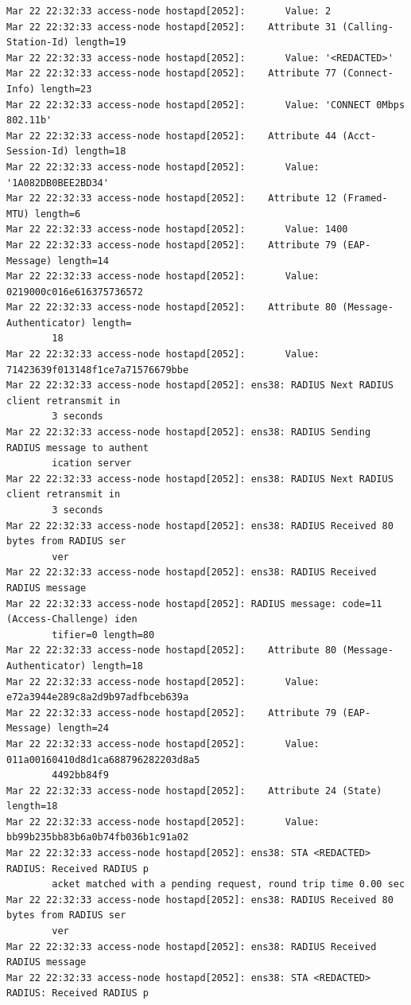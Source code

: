 \documentclass[11pt]{article}
\begin{document}
\begin{verbatim}
Mar 22 22:32:33 access-node hostapd[2052]:       Value: 2
Mar 22 22:32:33 access-node hostapd[2052]:    Attribute 31 (Calling-Station-Id) length=19
Mar 22 22:32:33 access-node hostapd[2052]:       Value: '<REDACTED>'
Mar 22 22:32:33 access-node hostapd[2052]:    Attribute 77 (Connect-Info) length=23
Mar 22 22:32:33 access-node hostapd[2052]:       Value: 'CONNECT 0Mbps 802.11b'
Mar 22 22:32:33 access-node hostapd[2052]:    Attribute 44 (Acct-Session-Id) length=18
Mar 22 22:32:33 access-node hostapd[2052]:       Value: '1A082DB0BEE2BD34'
Mar 22 22:32:33 access-node hostapd[2052]:    Attribute 12 (Framed-MTU) length=6
Mar 22 22:32:33 access-node hostapd[2052]:       Value: 1400
Mar 22 22:32:33 access-node hostapd[2052]:    Attribute 79 (EAP-Message) length=14
Mar 22 22:32:33 access-node hostapd[2052]:       Value: 0219000c016e616375736572
Mar 22 22:32:33 access-node hostapd[2052]:    Attribute 80 (Message-Authenticator) length=
        18
Mar 22 22:32:33 access-node hostapd[2052]:       Value: 71423639f013148f1ce7a71576679bbe
Mar 22 22:32:33 access-node hostapd[2052]: ens38: RADIUS Next RADIUS client retransmit in 
        3 seconds
Mar 22 22:32:33 access-node hostapd[2052]: ens38: RADIUS Sending RADIUS message to authent
        ication server
Mar 22 22:32:33 access-node hostapd[2052]: ens38: RADIUS Next RADIUS client retransmit in 
        3 seconds
Mar 22 22:32:33 access-node hostapd[2052]: ens38: RADIUS Received 80 bytes from RADIUS ser
        ver
Mar 22 22:32:33 access-node hostapd[2052]: ens38: RADIUS Received RADIUS message
Mar 22 22:32:33 access-node hostapd[2052]: RADIUS message: code=11 (Access-Challenge) iden
        tifier=0 length=80
Mar 22 22:32:33 access-node hostapd[2052]:    Attribute 80 (Message-Authenticator) length=18
Mar 22 22:32:33 access-node hostapd[2052]:       Value: e72a3944e289c8a2d9b97adfbceb639a
Mar 22 22:32:33 access-node hostapd[2052]:    Attribute 79 (EAP-Message) length=24
Mar 22 22:32:33 access-node hostapd[2052]:       Value: 011a00160410d8d1ca688796282203d8a5
        4492bb84f9
Mar 22 22:32:33 access-node hostapd[2052]:    Attribute 24 (State) length=18
Mar 22 22:32:33 access-node hostapd[2052]:       Value: bb99b235bb83b6a0b74fb036b1c91a02
Mar 22 22:32:33 access-node hostapd[2052]: ens38: STA <REDACTED> RADIUS: Received RADIUS p
        acket matched with a pending request, round trip time 0.00 sec
Mar 22 22:32:33 access-node hostapd[2052]: ens38: RADIUS Received 80 bytes from RADIUS ser
        ver
Mar 22 22:32:33 access-node hostapd[2052]: ens38: RADIUS Received RADIUS message
Mar 22 22:32:33 access-node hostapd[2052]: ens38: STA <REDACTED> RADIUS: Received RADIUS p

\end{verbatim}
\end{document}
